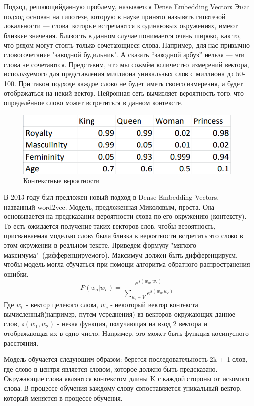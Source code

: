 Подход, решающийданную проблему,  называется Dense Embedding Vectors
Этот подход основан на гипотезе, которую в науке принято называть гипотезой локальности — слова, которые встречаются в одинаковых окружениях, имеют близкие значения. Близость в данном случае понимается очень широко, как то, что рядом могут стоять только сочетающиеся слова. Например, для нас привычно словосочетание "заводной будильник". А сказать “заводной арбуз”  нельзя — эти слова не сочетаются.
Представим, что мы сожмём количество измерений вектора, используемого для представления миллиона уникальных слов с миллиона  до 50-100. При таком подходе каждое слово не будет иметь своего измерения, а будет отображаться на некий вектор.
Нейронная сеть вычисляет вероятность того, что определённое слово может встретиться в данном контексте.
\begin{figure}[!h]
	\centering
	\includegraphics[width=.5\textwidth]{master_img/dense_emb_example_edited.png}
	\caption{Контекстные вероятности}
	\label{fig06_master}
\end{figure}

В 2013 году был предложен новый подход в Dense Embedding Vectors, названный word2vec.
Модель, предложенная Миколовым\cite{Book28}, проста. Она основывается на  предсказании вероятности слова по его окружению (контексту). То есть ожидается получение таких векторов слов, чтобы вероятность, присваиваемая моделью слову была близка к вероятности встретить это слово в этом окружении в реальном тексте.
Приведем формулу "мягкого максимума"\ (дифференцируемого). Максимум должен быть дифференцируем, чтобы модель могла обучаться при помощи алгоритма обратного распространения ошибки.
\begin{equation}
P(w_o|w_c) = \frac{e^{s(w_0, w_c)}}{\sum_{w_i \in V}e^{s(w_0, w_c)}}
\end{equation}
Где $w_0$ - вектор целевого слова, $w_c$  - некоторый вектор контекста вычисленный(например, путем усреднения) из векторов окружающих данное  слов, $s(w_1, w_2)$  - некая функция, получающая на вход 2 вектора и отображающая их в одно число. Например, это может быть функция косинусного расстояния.

Модель обучается следующим образом: берется последовательность 2k + 1 слов, где слово в центря является словом, которое должно быть предсказано. Окружающие слова являются контекстом длины K с каждой стороны от искомого слова. В процессе обучения каждому слову сопоставляется уникальный вектор, который меняется в процессе обучения.


